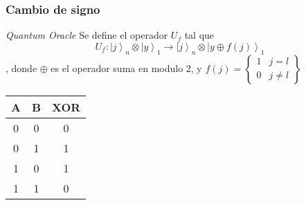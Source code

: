 \begin{frame}
	\frametitle{Cambio de signo}
	\begin{block}{\textit{Quantum Oracle}}
		Se define el operador $U_f$ tal que 
		\[U_{f}:\left.|j\right\rangle _{n}\otimes\left.|y\right\rangle _{1}\rightarrow\left.|j\right\rangle _{n}\otimes\left.|y\oplus f\left(j\right)\right\rangle _{1}\],
		donde $\oplus$ es el operador suma en modulo 2, y $f\left(j\right)=\left\{ \begin{array}{cc}
		1  & j=l\\
		0  & j\neq l
		\end{array}\right\} $
	\end{block}
	
	
	\begin{center}
		\begin{tabular}{|c c |c|} 
			\hline
			A & B & XOR \\ 
			\hline\hline
			0&0&0  \\ 
			\hline
			0&1&1  \\ 
			\hline
			1&0&1  \\
			\hline
			1&1&0 \\
			\hline
		\end{tabular}
	\end{center}
\end{frame}

